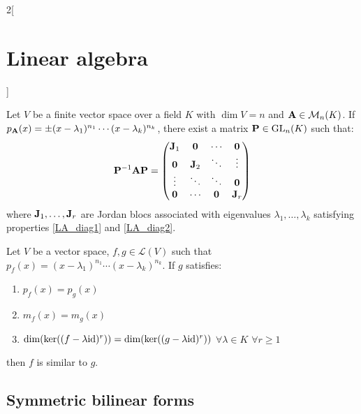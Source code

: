 \documentclass[../../../main.tex]{subfiles}
\begin{document}
\begin{multicols}{2}[\section{Linear algebra}]
\begin{prop}
\begin{enumerate}
    \end{enumerate}
  \end{prop}
  \begin{prop}
    Let $V$ be a finite vector space over a field $K$ with $\dim V=n$ and $\vb{A}\in\mathcal{M}_n(K)$. If $p_{\vb{A}}(x)=\pm(x-\lambda_1)^{n_1}\cdots(x-\lambda_k)^{n_k}$, there exist a matrix $\vb{P}\in\mathrm{GL}_n(K)$ such that:
    $$\vb{P}^{-1}\vb{A}\vb{P}=
      \begin{pmatrix}
        \vb{J}_1 & \vb{0}   & \cdots        & \vb{0}   \\
        \vb{0}   & \vb{J}_2 & \ddots        & \vdots          \\
        \vdots          & \ddots          & \ddots        & \vb{0}   \\
        \vb{0}   & \cdots          & \vb{0} & \vb{J}_r \\
      \end{pmatrix}
    $$
    where $\vb{J}_1,\ldots,\vb{J}_r$ are Jordan blocs associated with eigenvalues $\lambda_1,\ldots,\lambda_k$ satisfying properties \ref{LA_diag1} and \ref{LA_diag2}.
  \end{prop}
  \begin{theorem}
    Let $V$ be a vector space, $f,g\in\mathcal{L}(V)$ such that $p_f(x)=(x-\lambda_1)^{n_1}\cdots(x-\lambda_k)^{n_k}$. If $g$ satisfies:
    \begin{enumerate}
      \item $p_f(x)=p_g(x)$
      \item $m_f(x)=m_g(x)$
      \item $\dim(\ker((f-\lambda \mathrm{id})^r))=\dim(\ker((g-\lambda \mathrm{id})^r))$ $\forall\lambda\in K$ $\forall r\geq 1$
    \end{enumerate}
    then $f$ is similar to $g$.
  \end{theorem}
  \subsection{Symmetric bilinear forms}

\end{multicols}
\end{document}
